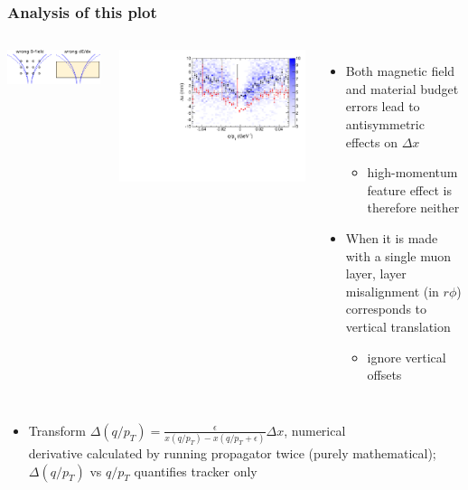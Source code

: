 \documentclass[compress]{beamer}
\begin{document}
\begin{frame}
\frametitle{Analysis of this plot}

\begin{columns}
\includegraphics[width=\linewidth]{things_that_are_antisymmetric.pdf}

\includegraphics[width=\linewidth]{residuals_real_both.pdf}
\begin{itemize}
\item Both magnetic field and material budget errors lead to antisymmetric effects on $\Delta x$
\begin{itemize}
\item high-momentum feature effect is therefore neither
\end{itemize}
\item When it is made with a single muon layer, layer misalignment (in
  $r\phi$) corresponds to vertical translation
\begin{itemize}
\item ignore vertical offsets
\end{itemize}
\end{itemize}
\end{columns}

\begin{itemize}
\item Transform $\displaystyle \Delta(q/p_T) = \frac{\epsilon}{x(q/p_T)
  - x(q/p_T + \epsilon)} \Delta x$, numerical \\ \vspace{0.2 cm} derivative calculated by
  running propagator twice (purely mathematical); $\Delta(q/p_T)$ vs $q/p_T$ quantifies tracker only
\end{itemize}
\end{frame}
\end{document}
